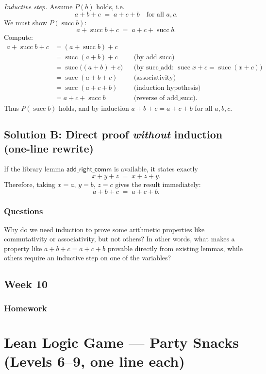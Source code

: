 \documentclass{article}
\theoremstyle{theorem}
\theoremstyle{definition}
\theoremstyle{remark}
\begin{document}
\emph{Inductive step.} Assume \(P(b)\) holds, i.e.
\[
a+b+c \;=\; a+c+b
\quad\text{for all }a,c.
\]
We must show \(P(\operatorname{succ} b)\):
\[
a+\operatorname{succ}b+c \;=\; a+c+\operatorname{succ}b.
\]
Compute:
\[
\begin{aligned}
a+\operatorname{succ}b+c
&= (a+\operatorname{succ}b)+c\\
&= \operatorname{succ}(a+b)+c &&\text{(by \(\text{add\_succ}\))}\\
&= \operatorname{succ}\big((a+b)+c\big) &&\text{(by \(\text{succ\_add}\): }\operatorname{succ}x+c=\operatorname{succ}(x+c))\\
&= \operatorname{succ}(a+b+c) &&\text{(associativity)}\\
&= \operatorname{succ}(a+c+b) &&\text{(induction hypothesis)}\\
&= a+c+\operatorname{succ}b &&\text{(reverse of \(\text{add\_succ}\)).}
\end{aligned}
\]
Thus \(P(\operatorname{succ}b)\) holds, and by induction \(a+b+c=a+c+b\) for all \(a,b,c\).

\subsection*{Solution B: Direct proof \emph{without} induction (one-line rewrite)}
If the library lemma \(\mathsf{add\_right\_comm}\) is available, it states exactly
\[
x + y + z \;=\; x + z + y .
\]
Therefore, taking \(x=a\), \(y=b\), \(z=c\) gives the result immediately:
\[
a + b + c \;=\; a + c + b.
\]


\subsubsection{Questions}
Why do we need induction to prove some arithmetic properties like commutativity or associativity, but not others? 
In other words, what makes a property like $a + b + c = a + c + b$ provable directly from existing lemmas, 
while others require an inductive step on one of the variables?

\subsection{Week 10}

\subsubsection{Homework}
\section*{Lean Logic Game — Party Snacks (Levels 6–9, one line each)}
\end{document}
